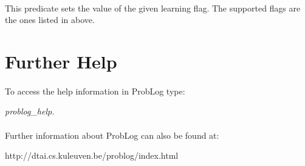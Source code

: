 \documentclass[a4paper,12pt]{article}
\begin{document}
\paragraph{}
This predicate sets the value of the given learning flag. The supported flags are the ones listed in above.


\section{Further Help}

\paragraph{}
To access the help information in ProbLog type:

\textit{problog\_help.}

\paragraph{}
Further information about ProbLog can also be found at:

http://dtai.cs.kuleuven.be/problog/index.html
\end{document}

